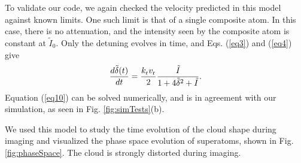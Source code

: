\documentclass[12pt]{iopart}
\begin{document}
\par To validate our code, we again checked the velocity predicted in this model against known limits. One such limit is that of a single composite atom. In this case, there is no attenuation, and the intensity seen by the composite atom is constant at $\tilde{I}_0$. Only the detuning  evolves in time, and Eqs. (\ref{eq3}) and (\ref{eq4}) give
\begin{equation}
\frac{d\tilde{\delta}(t)}{dt}= \frac{ k_{\rm{r}} v_{\rm{r}}}{2} \frac{\tilde{I}}{1+4\tilde{\delta}^2+\tilde{I}}.
\label{eq10}
\end{equation}
Equation (\ref{eq10}) can be solved numerically, and is in agreement with our simulation, as seen in Fig. \ref{fig:simTests}(b).
\par We used this model to study the time evolution of the cloud shape during imaging and visualized the phase space evolution of superatoms, shown in Fig. \ref{fig:phaseSpace}. The cloud is strongly distorted during imaging.
\end{document}
